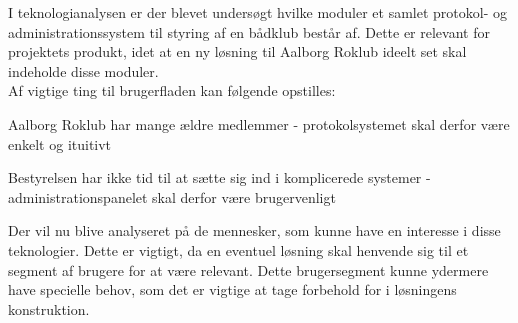 I teknologianalysen er der blevet undersøgt hvilke moduler et samlet protokol- og administrationssystem til styring af en bådklub består af. Dette er relevant for projektets produkt, idet at en ny løsning til Aalborg Roklub ideelt set skal indeholde disse moduler.\\

Af vigtige ting til brugerfladen kan følgende opstilles: 

\begin{itemize_small}
    \item Aalborg Roklub har mange ældre medlemmer - protokolsystemet skal derfor være enkelt og ituitivt
    \item Bestyrelsen har ikke tid til at sætte sig ind i komplicerede systemer - administrationspanelet skal derfor være brugervenligt
\end{itemize_small}


Der vil nu blive analyseret på de mennesker, som kunne have en interesse i disse teknologier. Dette er vigtigt, da en eventuel løsning skal henvende sig til et segment af brugere for at være relevant. Dette brugersegment kunne ydermere have specielle behov, som det er vigtige at tage forbehold for i løsningens konstruktion. 

